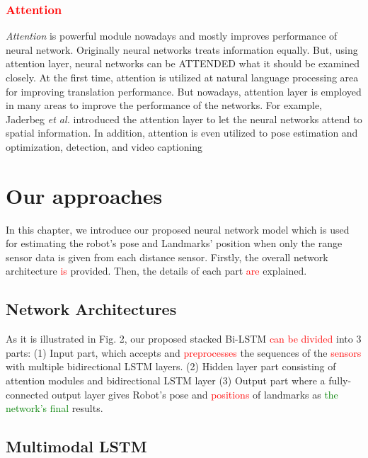 \documentclass[letterpaper, 10 pt, conference]{ieeeconf}  %
\begin{document}
\subsubsection{\textcolor{red}{Attention}}

 \textit{Attention} is powerful module nowadays and mostly improves performance of neural network. Originally neural networks treats information equally. But, using attention layer, neural networks can be ATTENDED what it should be examined closely. At the first time, attention is utilized at natural language processing area for improving translation performance\cite{luong2015effective}. But nowadays, attention layer is employed in many areas to improve the performance of the networks. For example, Jaderbeg \textit{et al.}\cite{jaderberg2015spatial} introduced the attention layer to let the neural networks attend to spatial information. In addition, attention is even utilized to pose estimation and optimization\cite{parisotto2018global}, detection\cite{zhu2018towards}, and video captioning\cite{xu2017learning} 

\section{Our approaches}

In this chapter, we introduce our proposed neural network model which is used for estimating the robot’s pose and Landmarks’ position when only the range sensor data is given from each distance sensor. Firstly, the overall network architecture \textcolor{red}{is} provided. Then, the details of each part \textcolor{red}{are} explained.   

\subsection{Network Architectures}

As it is illustrated in Fig. 2, our proposed stacked Bi-LSTM \textcolor{red}{can be divided} into 3 parts: (1) Input part, which accepts and \textcolor{red}{preprocesses} the sequences of the \textcolor{red}{sensors} with multiple bidirectional LSTM layers. (2) Hidden layer part consisting of attention modules and bidirectional LSTM layer (3) Output part where a fully-connected output layer gives Robot’s pose and \textcolor{red}{positions} of landmarks as \textcolor{green}{the network's final} results. 

\subsection{Multimodal LSTM}
\end{document}
